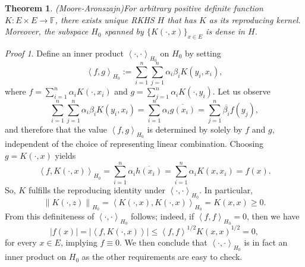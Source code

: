 \documentclass[a4paper,12pt]{article}
\newtheorem{thm}{Theorem}[section]
\theoremstyle{remark}
\newtheorem*{prf}{Proof}
\theoremstyle{definition}
\theoremstyle{definition}
\theoremstyle{definition}
\newcommand{\ip}[2]{\left<#1, #2 \right>}
\newcommand{\abs}[1]{\left| #1 \right|}
\newcommand{\norm}[1]{\left\| #1 \right\|}
\begin{document}
\begin{thm} (Moore-Aronszajn)\label{Moore Theorem}
	For arbitrary positive definite function \( K:E \times E \to \mathbb{F} \), there exists unique RKHS \( H \) that has \( K \) as its reproducing kernel. Moreover, the subspace \( H_0 \) spanned by \( \{K(\cdot ,x)\}_{x \in E} \) is dense in \( H \).
\end{thm}
\begin{prf}
	Define an inner product \( \ip{\cdot}{\cdot }_{H_0} \) on \( H_0 \) by setting
	\begin{equation*}
		\ip{f}{g}_{H_0} := \sum_{i=1}^{n} \sum_{j=1}^{n} \alpha_i \beta_i K(y_i,x_i),
	\end{equation*}
	where \( f= \sum_{i=1}^{n} \alpha_i K(\cdot ,x_i) \) and \( g= \sum_{j=1}^{n} \alpha_i K(\cdot ,y_i) \). Let us observe
	\begin{equation*}
		\sum_{i=1}^{n} \sum_{j=1}^{n} \alpha_i \beta_i K(y_i,x_i)
		= \sum_{i=1}^{n}\alpha_i \overline{g(x_i)} = \sum_{j=1}^{n} \overline{\beta_i}f(y_j),
	\end{equation*}
	and therefore that the value \( \ip{f}{g}_{H_0} \) is determined by solely by \( f \) and \( g \), independent of the choice of representing linear combination. Choosing \( g=K(\cdot ,x) \) yields
	\begin{equation*}
		\ip{f}{K(\cdot ,x)}_{H_0} = \sum_{i=1}^{n} \alpha_i \overline{h(x_i)}
		= \sum_{i=1}^{n} \alpha_i K(x,x_i) = f(x).
	\end{equation*}
	So, \( K \) fulfills the reproducing identity under \( \ip{\cdot }{\cdot }_{H_0} \). In particular,
	\begin{equation*}
		\norm{K(\cdot ,z)}_{H_0} = \ip{K(\cdot ,x)}{K(\cdot ,x)}_{H_0} = K(x,x) \ge 0.
	\end{equation*}
	From this definiteness of \( \ip{\cdot }{\cdot }_{H_0} \) follows; indeed, if \( \ip{f}{f}_{H_0} = 0 \), then we have
	\begin{equation*}
		\abs{f(x)} = \abs{\ip{f}{K(\cdot ,x)}} \le \ip{f}{f}^{1/2}K(x,x)^{1/2}=0,
	\end{equation*}
	for every \( x \in E \), implying \( f \equiv 0 \). We then conclude that \( \ip{\cdot }{\cdot }_{H_0} \) is in fact an inner product on \( H_0 \) as the other requirements are easy to check.


\end{prf}
\end{document}
